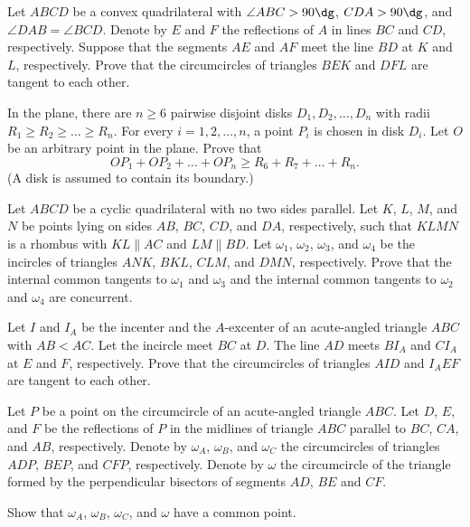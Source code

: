 \begin{probEG}[ISL 2020/G3]
  Let $ABCD$ be a convex quadrilateral with $\angle ABC>90\dg$, $CDA>90\dg$, and
  $\angle DAB=\angle BCD$. Denote by $E$ and $F$ the reflections of $A$ in lines
  $BC$ and $CD$, respectively. Suppose that the segments $AE$ and $AF$ meet the
  line $BD$ at $K$ and $L$, respectively. Prove that the circumcircles of
  triangles $BEK$ and $DFL$ are tangent to each other.
\end{probEG}

\begin{probMG}[ISL 2020/G4]
  In the plane, there are $n\ge 6$ pairwise disjoint disks $D_1,D_2,\dots,D_n$
  with radii $R_1\ge R_2\ge\dots\ge R_n$. For every $i=1,2,\dots,n$, a point
  $P_i$ is chosen in disk $D_i$. Let $O$ be an arbitrary point in the plane.
  Prove that
  \[OP_1+OP_2+\dots+OP_n\ge R_6+R_7+\dots+R_n.\]
  (A disk is assumed to contain its boundary.)
\end{probMG}

\begin{probMG}[ISL 2020/G5]
  Let $ABCD$ be a cyclic quadrilateral with no two sides parallel. Let $K$, $L$,
  $M$, and $N$ be points lying on sides $AB$, $BC$, $CD$, and $DA$,
  respectively, such that $KLMN$ is a rhombus with $KL\parallel AC$ and
  $LM\parallel BD$. Let $\omega_1$, $\omega_2$, $\omega_3$, and $ \omega_4$ be
  the incircles of triangles $ANK$, $BKL$, $CLM$, and $DMN$, respectively. Prove
  that the internal common tangents to $\omega_1$ and $\omega_3$ and the
  internal common tangents to $\omega_2$ and $\omega_4$ are concurrent.
\end{probMG}

\begin{probMG}[ISL 2020/G6]
  Let $I$ and $I_A$ be the incenter and the $A$-excenter of an acute-angled
  triangle $ABC$ with $AB<AC$. Let the incircle meet $BC$ at $D$. The line $AD$
  meets $BI_A$ and $CI_A$ at $E$ and $F$, respectively. Prove that the
  circumcircles of triangles $AID$ and $I_AEF$ are tangent to each other.
\end{probMG}

\begin{probMG}[ISL 2020/G7]
  Let $P$ be a point on the circumcircle of an acute-angled triangle $ABC$. Let
  $D$, $E$, and $F$ be the reflections of $P$ in the midlines of triangle $ABC$
  parallel to $BC$, $CA$, and $AB$, respectively. Denote by $\omega_A$,
  $\omega_B$, and $\omega_C$ the circumcircles of triangles $ADP$, $BEP$, and
  $CFP$, respectively. Denote by $\omega$ the circumcircle of the triangle
  formed by the perpendicular bisectors of segments $AD$, $BE$ and $CF$.

  Show that $\omega_A$, $\omega_B$, $\omega_C$, and $\omega$ have a common
  point.
\end{probMG}

